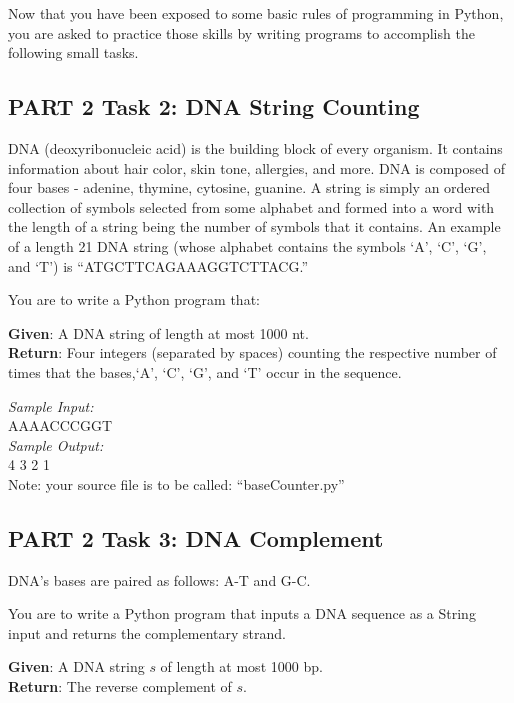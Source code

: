 \noindent Now that you have been exposed to some basic rules of programming in Python, you are asked to practice those skills by writing  programs to accomplish the following small tasks.

\vspace*{-.1in}
\subsection*{PART 2  Task 2: DNA String Counting}
\vspace*{-.1in} 
DNA (deoxyribonucleic acid) is the building block of every organism. It contains information about hair color, skin tone, allergies, and more.  DNA is composed of four bases - adenine, thymine, cytosine, guanine. A string is simply an ordered collection of symbols selected from some alphabet and formed into a word with the length of a string being the number of symbols that it contains. An example of a length 21 DNA string (whose alphabet contains the symbols `A', `C', `G', and `T') is ``ATGCTTCAGAAAGGTCTTACG.'' 

\color{red}
You are to write a Python program that:

\noindent \textbf{Given}: A DNA string of length at most 1000 nt. \\ 
\textbf{Return}: Four integers (separated by spaces) counting the respective number of times that the bases,`A', `C', `G', and `T' occur in the sequence.
\color{black}


\noindent \emph{Sample Input: } \\
\noindent AAAACCCGGT \\
\emph{Sample Output: } \\
4 3 2 1\\
\noindent
Note: your source file is to be called: ``baseCounter.py''

\vspace*{-.1in}
\subsection*{PART 2 Task 3: DNA Complement}
\vspace*{-.1in} 
DNA's bases are paired as follows: A-T and G-C. 

\color{red}
You are to write a Python program that inputs a DNA sequence as a String input and returns the complementary strand.

\noindent \textbf{Given}: A DNA string $s$ of length at most 1000 bp. \\
\textbf{Return}: The reverse complement of $s$.
\color{black}

